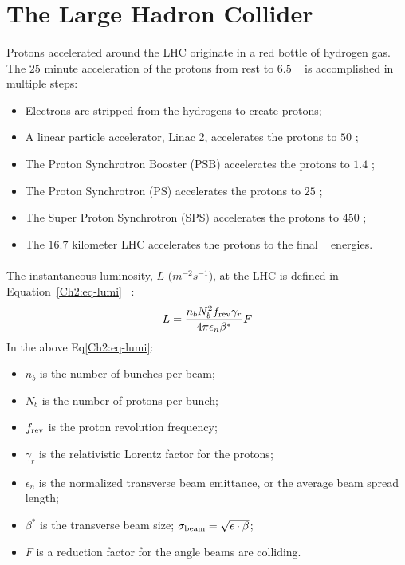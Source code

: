 \section{The Large Hadron Collider}
\label{sec:LHC}
\paragraph{}
Protons accelerated around the LHC originate in a red bottle of hydrogen gas. 
The $25$ minute acceleration of the protons from rest to $6.5$ \TeV~ is accomplished in multiple steps:
\begin{itemize}
\item Electrons are stripped from the hydrogens to create protons;
\item A linear particle accelerator, Linac 2, accelerates the protons to $50$ \MeV; 
\item The Proton Synchrotron Booster (PSB) accelerates the protons to $1.4$ \GeV;
\item The Proton Synchrotron (PS) accelerates the protons to $25$ \GeV; 
\item The Super Proton Synchrotron (SPS) accelerates the protons to $450$ \GeV;
\item The $16.7$ kilometer LHC accelerates the protons to the final \TeV~ energies. 
\end{itemize}

\paragraph{}
The instantaneous luminosity, $L$ ($m^{-2}s^{-1}$), at the LHC is defined in Equation~\ref{Ch2:eq-lumi} ~\cite{LHCReview}:
%
\begin{equation}
\label{Ch2:eq-lumi}
L = \frac{n_b N_b^2 f_{\rm rev} \gamma_r}{4\pi \epsilon_n \beta^*} F
\end{equation}
%
In the above Eq\ref{Ch2:eq-lumi}:
\begin{itemize}
	\item $n_b$ is the number of bunches per beam; %
	\item $N_b$ is the number of protons per bunch;  
	\item $f_{\rm rev}$ is the proton revolution frequency;
	\item $\gamma_r$ is the relativistic Lorentz factor for the protons;
	\item $\epsilon_n$ is the normalized transverse beam emittance, or the average beam spread length;
	\item $\beta^*$ is the transverse beam size; $\sigma_{\rm beam} = \sqrt{\epsilon \cdot \beta}$; %
	\item $F$ is a reduction factor for the angle beams are colliding. %
\end{itemize}

